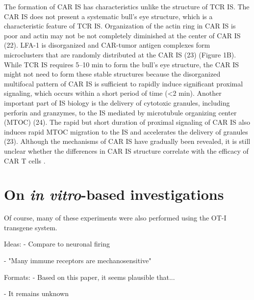 The formation of CAR IS has characteristics unlike the structure of TCR IS. The CAR IS does not present a systematic bull's eye structure, which is a characteristic feature of TCR IS. Organization of the actin ring in CAR IS is poor and actin may not be not completely diminished at the center of CAR IS (22). LFA-1 is disorganized and CAR-tumor antigen complexes form microclusters that are randomly distributed at the CAR IS (23) (Figure 1B). While TCR IS requires 5–10 min to form the bull's eye structure, the CAR IS might not need to form these stable structures because the disorganized multifocal pattern of CAR IS is sufficient to rapidly induce significant proximal signaling, which occurs within a short period of time (<2 min). Another important part of IS biology is the delivery of cytotoxic granules, including perforin and granzymes, to the IS mediated by microtubule organizing center (MTOC) (24). The rapid but short duration of proximal signaling of CAR IS also induces rapid MTOC migration to the IS and accelerates the delivery of granules (23). Although the mechanisms of CAR IS have gradually been revealed, it is still unclear whether the differences in CAR IS structure correlate with the efficacy of CAR T cells \cite{Li2020, Watanabe2018}.

\section{On \textit{in vitro}-based investigations}

Of course, many of these experiments were also performed using the OT-I transgene system. 


Ideas:
- Compare to neuronal firing

- "Many immune receptors are mechanosensitive"

Formats:
- Based on this paper, it seems plausible that...

- It remains unknown 

